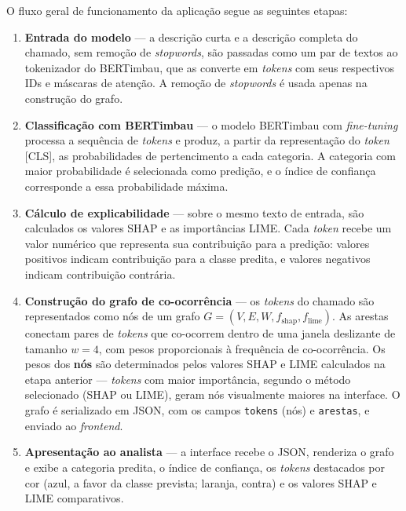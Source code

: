\documentclass[
    12pt,                %
    openright,           %
    oneside,             %
    a4paper,             %
    english,             %
    brazil               %
]{abntex2}
\begin{document}
O fluxo geral de funcionamento da aplicação segue as seguintes etapas:

\begin{enumerate}
    \item \textbf{Entrada do modelo} — a descrição curta e a descrição completa do chamado, sem remoção de \textit{stopwords}, são passadas como um par de textos ao tokenizador do BERTimbau, que as converte em \textit{tokens} com seus respectivos IDs e máscaras de atenção. A remoção de \textit{stopwords} é usada apenas na construção do grafo.

    \item \textbf{Classificação com BERTimbau} — o modelo BERTimbau com \textit{fine-tuning} processa a sequência de \textit{tokens} e produz, a partir da representação do \textit{token} [CLS], as probabilidades de pertencimento a cada categoria. A categoria com maior probabilidade é selecionada como predição, e o índice de confiança corresponde a essa probabilidade máxima.

    \item \textbf{Cálculo de explicabilidade} — sobre o mesmo texto de entrada, são calculados os valores SHAP e as importâncias LIME. Cada \textit{token} recebe um valor numérico que representa sua contribuição para a predição: valores positivos indicam contribuição para a classe predita, e valores negativos indicam contribuição contrária.

    \item \textbf{Construção do grafo de co-ocorrência} — os \textit{tokens} do chamado são representados como nós de um grafo $G = (V, E, W, f_{\text{shap}}, f_{\text{lime}})$. As arestas conectam pares de \textit{tokens} que co-ocorrem dentro de uma janela deslizante de tamanho $w = 4$, com pesos proporcionais à frequência de co-ocorrência. Os pesos dos \textbf{nós} são determinados pelos valores SHAP e LIME calculados na etapa anterior — \textit{tokens} com maior importância, segundo o método selecionado (SHAP ou LIME), geram nós visualmente maiores na interface. O grafo é serializado em JSON, com os campos \texttt{tokens} (nós) e \texttt{arestas}, e enviado ao \textit{frontend}.

    \item \textbf{Apresentação ao analista} — a interface recebe o JSON, renderiza o grafo e exibe a categoria predita, o índice de confiança, os \textit{tokens} destacados por cor (azul, a favor da classe prevista; laranja, contra) e os valores SHAP e LIME comparativos.
\end{enumerate}
\end{document}

